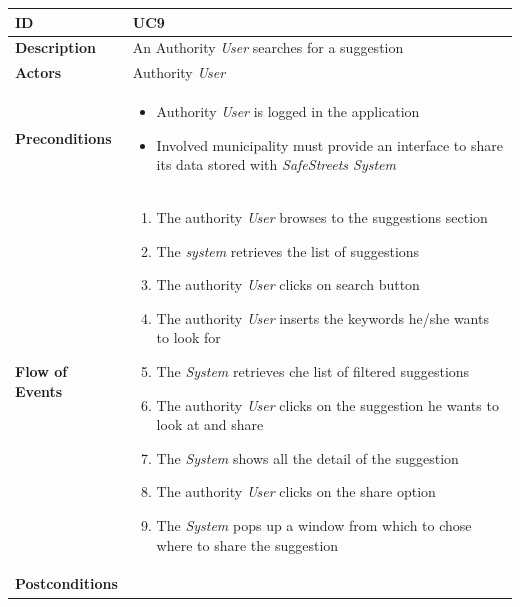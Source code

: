 \begin{table}[H]
\begin{tabular}{|l|p{}|}
\hline
\textbf{ID}             & UC9                                                                           \\ \hline
\textbf{Description}    & An Authority \textit{User} searches for a suggestion \\ \hline
\textbf{Actors}         &  Authority \textit{User}                                                                       \\ \hline

\textbf{Preconditions}  &   \begin{itemize}

 \item Authority \textit{User} is logged in the application
 \item Involved municipality must provide an interface to share its data stored with \textit{SafeStreets System}
                 \end{itemize}     
                    \\ \hline
                    
\textbf{Flow of Events} &   \begin{enumerate}
    \item The authority \textit{User} browses to the suggestions section
   
   \item The \textit{system} retrieves the list of suggestions
   \item The authority \textit{User} clicks on search button
   \item The authority \textit{User} inserts the keywords he/she wants to look for
   \item The \textit{System} retrieves che list of filtered suggestions
    \item The authority \textit{User} clicks on the suggestion he wants to look at and share
    \item The \textit{System} shows all the detail of the suggestion
    \item The authority \textit{User} clicks on the share option
    \item The \textit{System} pops up a window from which to chose where to share the suggestion

\end{enumerate}                                                                             \\ \hline
\textbf{Postconditions} & \begin{itemize}
     

\end{itemize}
\end{tabular}
\end{table}
